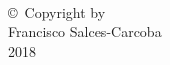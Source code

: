 
\thispagestyle{empty}
\hbox{\ }

\vfill
\renewcommand{\baselinestretch}{1}
\small\normalsize

\vspace{-.65in}

\begin{center}
\large{\copyright \hbox{ }Copyright by\\
Francisco Salces-Carcoba  %
\\
2018}
\end{center}

\vfill
